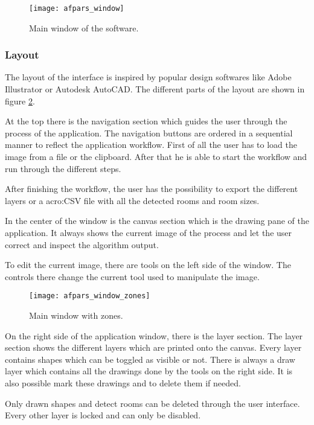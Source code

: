 \begin{figure}[h!]
  \centering
      \texttt{[image: afpars\_window]}
  \caption{Main window of the software.}
  \label{fig:afpars_window}
\end{figure}

\subsubsection{Layout}

The layout of the interface is inspired by popular design softwares like Adobe Illustrator or Autodesk AutoCAD. The different parts of the layout are shown in figure \ref{fig:afpars_window_zones}.

At the top there is the navigation section which guides the user through the process of the application. The navigation buttons are ordered in a sequential manner to reflect the application workflow. First of all the user has to load the image from a file or the clipboard. After that he is able to start the workflow and run through the different steps.

After finishing the workflow, the user has the possibility to export the different layers or a \gls{acro:CSV} file with all the detected rooms and room sizes.

In the center of the window is the canvas section which is the drawing pane of the application. It always shows the current image of the process and let the user correct and inspect the algorithm output.

To edit the current image, there are tools on the left side of the window. The controls there change the current tool used to manipulate the image.


\begin{figure}[h!]
  \centering
      \texttt{[image: afpars\_window\_zones]}
  \caption{Main window with zones.}
  \label{fig:afpars_window_zones}
\end{figure}

On the right side of the application window, there is the layer section. The layer section shows the different layers which are printed onto the canvas. Every layer contains shapes which can be toggled as visible or not. There is always a draw layer which contains all the drawings done by the tools on the right side. It is also possible mark these drawings and to delete them if needed.

Only drawn shapes and detect rooms can be deleted through the user interface. Every other layer is locked and can only be disabled.

